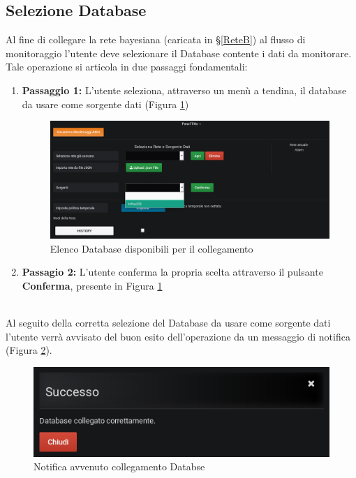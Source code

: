 \subsection{Selezione Database}\label{SelectDB}

Al fine di collegare la rete bayesiana (caricata in §\ref{ReteB}) al flusso di monitoraggio l'utente deve selezionare il Database contente i dati da monitorare.\\
Tale operazione si articola in due passaggi fondamentali:
\begin{enumerate}
	\item \textbf{Passaggio 1:} L'utente seleziona, attraverso un menù a tendina, il database da usare come sorgente dati (Figura \ref{Sorgenti})
	\begin{figure}[H]
	\begin{center}
		\includegraphics[scale=0.35]{./images/Sorgenti.png}
		 \caption{Elenco Database disponibili per il collegamento}	
		 \label{Sorgenti}
	\end{center}
	\end{figure}
	\item \textbf{Passagio 2:} L'utente conferma la propria scelta attraverso il pulsante \textbf{Conferma}, presente in Figura \ref{Sorgenti}
\end{enumerate}
~\\
Al seguito della corretta selezione del Database da usare come sorgente dati l'utente verrà avvisato del buon esito dell'operazione da un messaggio di notifica (Figura \ref{NotificaSorgente}). 

\begin{figure}[H]
	\begin{center}
		\includegraphics[scale=0.6]{./images/NotificaSorgente.png}
		 \caption{Notifica avvenuto collegamento Databse}	
		 \label{NotificaSorgente}
	\end{center}
\end{figure}